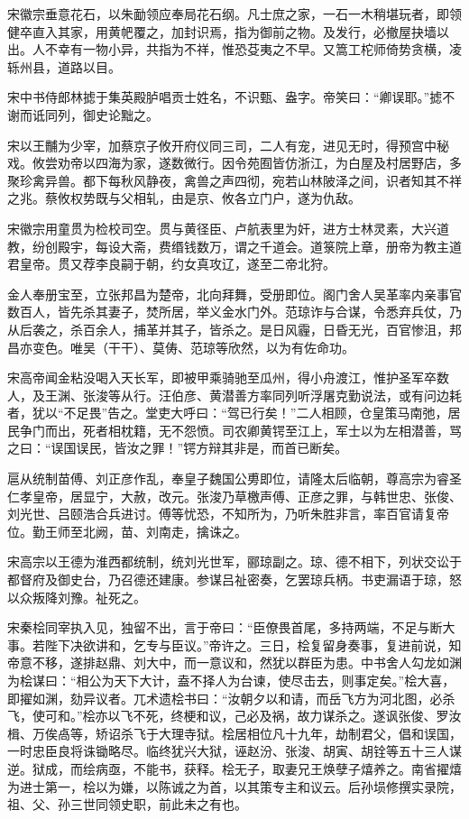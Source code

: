 \documentclass[a4paper,12pt,UTF8,twoside]{ctexbook}
\begin{document}
    宋徽宗垂意花石，以朱勔领应奉局花石纲。凡士庶之家，一石一木稍堪玩者，即领健卒直入其家，用黄帊覆之，加封识焉，指为御前之物。及发行，必撤屋抉墙以出。人不幸有一物小异，共指为不祥，惟恐芟夷之不早。又篙工柁师倚势贪横，凌轹州县，道路以目。
    
    宋中书侍郎林摅于集英殿胪唱贡士姓名，不识甄、盎字。帝笑曰：“卿误耶。”摅不谢而诋同列，御史论黜之。
    
    宋以王黼为少宰，加蔡京子攸开府仪同三司，二人有宠，进见无时，得预宫中秘戏。攸尝劝帝以四海为家，遂数微行。因令苑囿皆仿浙江，为白屋及村居野店，多聚珍禽异兽。都下每秋风静夜，禽兽之声四彻，宛若山林陂泽之间，识者知其不祥之兆。蔡攸权势既与父相轧，由是京、攸各立门户，遂为仇敌。
    
    宋徽宗用童贯为检校司空。贯与黄径臣、卢航表里为奸，进方士林灵素，大兴道教，纷创殿宇，每设大斋，费缗钱数万，谓之千道会。道箓院上章，册帝为教主道君皇帝。贯又荐李良嗣于朝，约女真攻辽，遂至二帝北狩。
    
    金人奉册宝至，立张邦昌为楚帝，北向拜舞，受册即位。阁门舍人吴革率内亲事官数百人，皆先杀其妻子，焚所居，举义金水门外。范琼诈与合谋，令悉弃兵仗，乃从后袭之，杀百余人，捕革并其子，皆杀之。是日风霾，日昏无光，百官惨沮，邦昌亦变色。唯吴（干干）、莫俦、范琼等欣然，以为有佐命功。
    
    宋高帝闻金粘没喝入天长军，即被甲乘骑驰至瓜州，得小舟渡江，惟护圣军卒数人，及王渊、张浚等从行。汪伯彦、黄潜善方率同列听浮屠克勤说法，或有问边耗者，犹以“不足畏”告之。堂吏大呼曰：“驾已行矣！”二人相顾，仓皇策马南弛，居民争门而出，死者相枕籍，无不怨愤。司农卿黄锷至江上，军士以为左相潜善，骂之曰：“误国误民，皆汝之罪！”锷方辩其非是，而首已断矣。
    
    扈从统制苗傅、刘正彦作乱，奉皇子魏国公旉即位，请隆太后临朝，尊高宗为睿圣仁孝皇帝，居显宁，大赦，改元。张浚乃草檄声傅、正彦之罪，与韩世忠、张俊、刘光世、吕颐浩合兵进讨。傅等忧恐，不知所为，乃听朱胜非言，率百官请复帝位。勤王师至北阙，苗、刘南走，擒诛之。
    
    宋高宗以王德为淮西都统制，统刘光世军，郦琼副之。琼、德不相下，列状交讼于都督府及御史台，乃召德还建康。参谋吕祉密奏，乞罢琼兵柄。书吏漏语于琼，怒以众叛降刘豫。祉死之。
    
    宋秦桧同宰执入见，独留不出，言于帝曰：“臣僚畏首尾，多持两端，不足与断大事。若陛下决欲讲和，乞专与臣议。”帝许之。三日，桧复留身奏事，复进前说，知帝意不移，遂排赵鼎、刘大中，而一意议和，然犹以群臣为患。中书舍人勾龙如渊为桧谋曰：“相公为天下大计，盍不择人为台谏，使尽击去，则事定矣。”桧大喜，即擢如渊，劾异议者。兀术遗桧书曰：“汝朝夕以和请，而岳飞方为河北图，必杀飞，使可和。”桧亦以飞不死，终梗和议，己必及祸，故力谋杀之。遂讽张俊、罗汝楫、万俟卨等，矫诏杀飞于大理寺狱。桧居相位凡十九年，劫制君父，倡和误国，一时忠臣良将诛锄略尽。临终犹兴大狱，诬赵汾、张浚、胡寅、胡铨等五十三人谋逆。狱成，而绘病亟，不能书，获释。桧无子，取妻兄王焕孽子熺养之。南省擢熺为进士第一，桧以为嫌，以陈诚之为首，以其策专主和议云。后孙埙修撰实录院，祖、父、孙三世同领史职，前此未之有也。
    
\end{document}
